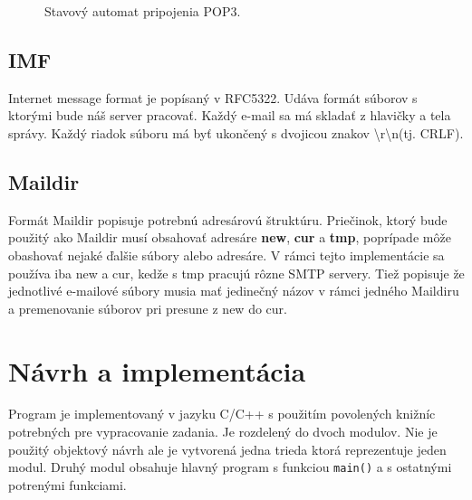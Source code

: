 \documentclass[11pt,a4paper]{article}
\begin{document}
\begin{figure}[h]
  \centering
  \caption{Stavový automat pripojenia POP3.}
  \label{fig:pop3FSM}
\end{figure}


\subsection{IMF}
Internet message format je popísaný v RFC5322\cite{imf}. Udáva formát súborov s ktorými bude náš server pracovať. Každý e-mail sa má skladať z hlavičky a tela správy. Každý riadok súboru má byť ukončený s dvojicou znakov \textbackslash r\textbackslash n(tj. CRLF). 


\subsection{Maildir}
Formát Maildir\cite{maildir} popisuje potrebnú adresárovú štruktúru. Priečinok, ktorý bude použitý ako Maildir musí obsahovať adresáre \textbf{new}, \textbf{cur} a \textbf{tmp}, poprípade môže obashovať nejaké ďalšie súbory alebo adresáre. V rámci tejto implementácie sa používa iba new a cur, kedže s tmp pracujú rôzne SMTP servery. Tiež popisuje že jednotlivé e-mailové súbory musia mať jedinečný názov v rámci jedného Maildiru a premenovanie súborov pri presune z new do cur.


\section{Návrh a implementácia}
Program je implementovaný v jazyku C/C++ s použitím povolených knižníc potrebných pre vypracovanie zadania. Je rozdelený do dvoch modulov. Nie je použitý objektový návrh ale je vytvorená jedna trieda ktorá reprezentuje jeden modul. Druhý modul obsahuje hlavný program s funkciou \texttt{main()} a s ostatnými potrenými funkciami.   
\end{document}
